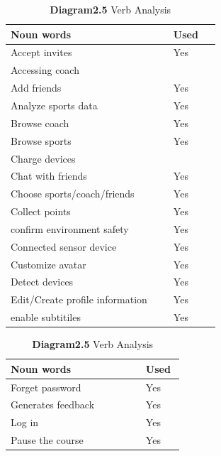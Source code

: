 \documentclass[a4paper]{article}
\begin{document}
	\begin{table}[h!]
		\caption*{\textbf{Diagram2.5} Verb Analysis}
		\noindent\begin{minipage}{\textwidth}
			\begin{minipage}[t]{0.48\textwidth}
		 	\centering
			\makeatletter{}\makeatother
			  	\begin{tabular}{|p{0.7\linewidth}|p{0.2\linewidth}|} 
		   			\hline
					\textbf{Noun words} & \textbf{Used} \\
					\hline
					Accept invites & Yes\\
					\hline
					Accessing coach & \\
					\hline
					Add friends & Yes\\
					\hline
					Analyze sports data & Yes\\
					\hline
					Browse coach & Yes\\
					\hline
					Browse sports & Yes\\
					\hline
					Charge devices & \\
					\hline
					Chat with friends & Yes\\
					\hline
					Choose sports/coach/friends& Yes\\
					\hline
					Collect points & Yes\\
					\hline
					confirm environment safety & Yes\\
					\hline
					Connected sensor device & Yes\\
					\hline
					Customize avatar & Yes\\
					\hline
					Detect devices & Yes\\
					\hline
					Edit/Create profile information& Yes\\
					\hline
					enable subtitiles& Yes\\
					\hline
		   		\end{tabular}
		 	\end{minipage}
		 	\begin{minipage}[t]{0.48\textwidth}
		  	\centering
			   	\makeatletter{}\makeatother
				\begin{tabular}{|p{0.7\linewidth}|p{0.2\linewidth}|}        
					\hline
					\textbf{Noun words} & \textbf{Used} \\
					\hline
					Forget password & Yes\\
					\hline
					Generates feedback & Yes\\
					\hline
					Log in & Yes\\
					\hline
					Pause the course & Yes\\

\end{tabular}
\end{minipage}
\end{minipage}
\end{table}
\end{document}
